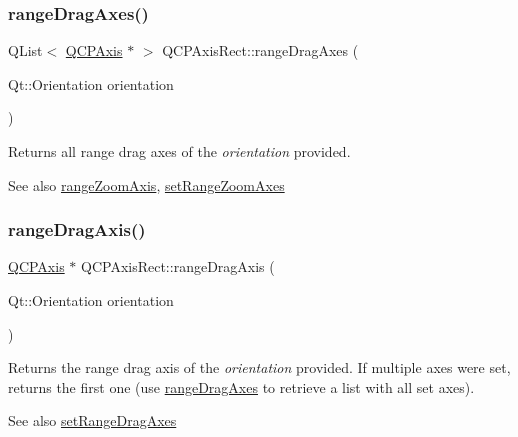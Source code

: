 \subsubsection{\texorpdfstring{range\+Drag\+Axes()}{rangeDragAxes()}}
{\footnotesize\ttfamily Q\+List$<$ \hyperlink{classQCPAxis}{Q\+C\+P\+Axis} $\ast$ $>$ Q\+C\+P\+Axis\+Rect\+::range\+Drag\+Axes (\begin{DoxyParamCaption}\item[{Qt\+::\+Orientation}]{orientation }\end{DoxyParamCaption})}

Returns all range drag axes of the {\itshape orientation} provided.

\begin{DoxySeeAlso}{See also}
\hyperlink{classQCPAxisRect_a679c63f2b8daccfe6ec5110dce3dd3b6}{range\+Zoom\+Axis}, \hyperlink{classQCPAxisRect_a9442cca2aa358405f39a64d51eca13d2}{set\+Range\+Zoom\+Axes} 
\end{DoxySeeAlso}
\mbox{\label{classQCPAxisRect_a6d7c22cfc54fac7a3d6ef80b133a8574}} 
\subsubsection{\texorpdfstring{range\+Drag\+Axis()}{rangeDragAxis()}}
{\footnotesize\ttfamily \hyperlink{classQCPAxis}{Q\+C\+P\+Axis} $\ast$ Q\+C\+P\+Axis\+Rect\+::range\+Drag\+Axis (\begin{DoxyParamCaption}\item[{Qt\+::\+Orientation}]{orientation }\end{DoxyParamCaption})}

Returns the range drag axis of the {\itshape orientation} provided. If multiple axes were set, returns the first one (use \hyperlink{classQCPAxisRect_aae5f99a044ca911685a306f01b7ff941}{range\+Drag\+Axes} to retrieve a list with all set axes).

\begin{DoxySeeAlso}{See also}
\hyperlink{classQCPAxisRect_a648cce336bd99daac4a5ca3e5743775d}{set\+Range\+Drag\+Axes} 
\end{DoxySeeAlso}
\mbox{\label{classQCPAxisRect_a86aac0f435f209d60dacd22cda10c104}} 
